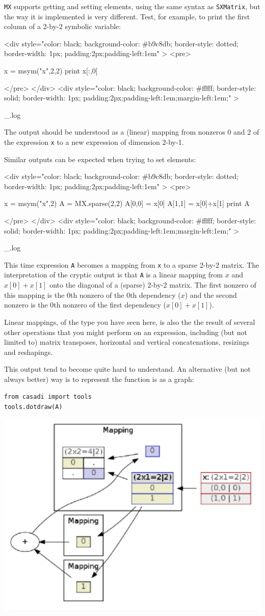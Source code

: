 \documentclass[a4paper,12pt]{book}
\newcounter{pytexcount}
\newcounter{pytexsubcount}
\renewenvironment{pytex}
{\addtocounter{pytexsubcount}{1}%
\begin{rawhtml}
<div style="color: black; background-color: \#b9c8db;  border-style: dotted; border-width: 1px; padding:2px;padding-left:1em" >
<pre>
\end{rawhtml}
}%
{\begin{rawhtml}
</pre>
</div>
<div style="color: black; background-color: \#fffff;  border-style: solid; border-width: 1px; padding:2px;padding-left:1em;margin-left:1em;" >\end{rawhtml}
_\arabic{pytexsubcount}.log}%
\begin{rawhtml}
</div>
\end{rawhtml}
}
\begin{document}
{\texttt{MX} supports getting and setting elements, using the same syntax as \texttt{SXMatrix}, but the way it is implemented is very different. Test, for example, to print the first column of a 2-by-2 symbolic variable:
\begin{pytex}
x = msym("x",2,2)
print x[:,0] 
\end{pytex}

The output should be understood as a (linear) mapping from nonzeros 0 and 2 of the expression \texttt{x} to a new expression of dimension 2-by-1.

Similar outputs can be expected when trying to set elements:
\begin{pytex}
x = msym("x",2)
A = MX.sparse(2,2)
A[0,0] = x[0]
A[1,1] = x[0]+x[1]
print A
\end{pytex}

This time expression \texttt{A} becomes a mapping from \texttt{x} to a sparse 2-by-2 matrix. The interpretation of the cryptic output is that \texttt{A} is a linear mapping from $x$ and $x[0]+x[1]$ onto the diagonal of a (sparse) 2-by-2 matrix. The first nonzero of this mapping is the 0th nonzero of the 0th dependency ($x$) and the second nonzero is the 0th nonzero of the first dependency ($x[0]+x[1]$). 

Linear mappings, of the type you have seen here, is also the the result of several other operations that you might perform on an expression, including (but not limited to) matrix transposes, horizontal and vertical concatenations, resizings and reshapings.

This output tend to become quite hard to understand. An alternative (but not always better) way is to represent the function is as a graph:

\begin{minipage}[t]{0.45\textwidth}
\texttt{from casadi import tools} \\
\texttt{tools.dotdraw(A)} \\
\end{minipage}
\begin{minipage}[t]{0.45\textwidth}
\begin{center}
\includegraphics[width=\textwidth]{mxdraw}
\end{center}
\end{minipage}

}
\end{document}

